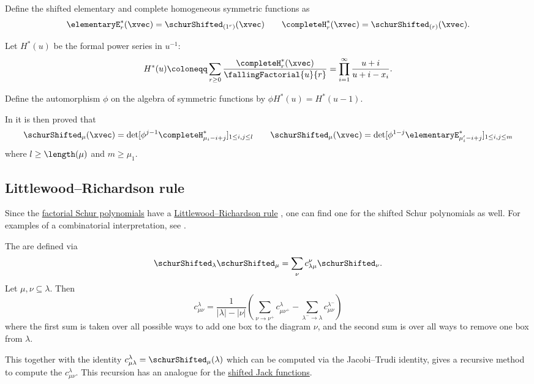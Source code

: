 Define the shifted elementary and complete homogeneous symmetric functions as
\[
\elementaryE^*_r(\xvec) = \schurShifted_{(1^r)}(\xvec)\qquad
\completeH^*_r(\xvec) = \schurShifted_{(r)}(\xvec).
\]

Let $H^*(u)$ be the formal power series in $u^{-1}$:
\[
H^*(u) \coloneqq
\sum_{r\geq 0} \frac{ \completeH^*_r(\xvec) }{ \fallingFactorial{u}{r} } =
\prod_{i=1}^\infty \frac{u+i}{u+i-x_i}.
\]

Define the automorphism $\phi$ on the algebra of symmetric functions by
$\phi H^*(u) = H^*(u-1)$.

In \cite{OkounkovOlshanski1996} it is then proved that
\[
\schurShifted_{\mu}(\xvec)
= \det[ \phi^{j-1} \completeH^*_{\mu_i - i +j} ]_{1\leq i,j \leq l}
\qquad 
\schurShifted_{\mu}(\xvec)
= \det[ \phi^{1-j} \elementaryE^*_{\mu'_i - i +j} ]_{1\leq i,j \leq m}
\]
where $l \geq \length(\mu)$ and $m \geq \mu_1$.

\subsection[schurShiftedLittlewoodRichardson]{Littlewood--Richardson rule}

Since the \hyperref[schurFactorial]{factorial Schur polynomials}
have a \hyperref[littlewoodRichardsonModels]{Littlewood--Richardson rule}
\cite{MolevSagan1999},
one can find one for the shifted Schur polynomials as well.
For examples of a combinatorial interpretation, see \cite{Molev2009}.

\begin{theorem}
The 
\label{shiftedSchurLittlewoodRichardsonCoefficient} are defined via
\[
\schurShifted_{\lambda}\schurShifted_{\mu} = \sum_{\nu} c^{\nu}_{\lambda \mu} \schurShifted_{\nu}.
\]
Let $\mu, \nu \subseteq \lambda$. Then
\begin{equation*}
c^{\lambda}_{\mu\nu} = 
\frac{1}{|\lambda|-|\nu|}\left( 
 \sum_{\nu \to \nu^+}  c^{\lambda}_{\mu \nu^+} - \sum_{\lambda^- \to \lambda }  c^{\lambda^-}_{\mu \nu}
\right)
\end{equation*}
where the first sum is taken over all possible ways to add one box to the diagram $\nu$,
and the second sum is over all ways to remove one box from $\lambda$.

This together with the identity 
$c^{\lambda}_{\mu \lambda} = \schurShifted_\mu(\lambda)$ 
which can be computed via the Jacobi--Trudi identity, gives a recursive method
to compute the $c^{\lambda}_{\mu\nu}$.
This recursion has an analogue for the
\hyperref[jackShiftedLittlewoodRichardsonFormula]{shifted Jack functions}.
\end{theorem}

